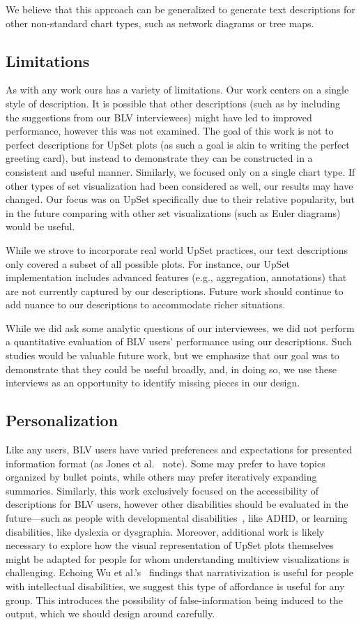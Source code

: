 \documentclass{egpubl}
\newcommand{\etal}{et al.}
\newcommand{\etals}{et al.'s}
\newcommand{\eg}{{e.g.,}}
\begin{document}
We believe that this approach can be generalized to generate text descriptions for other non-standard chart types, such as network diagrams or tree maps.

\subsection{Limitations}
As with any work ours has a variety of limitations.
Our work centers on a single style of description. It is possible that other descriptions (such as by including the suggestions from our BLV interviewees) might have led to improved performance, however this was not examined. The goal of this work is not to perfect descriptions for UpSet plots (as such a goal is akin to writing the perfect greeting card), but instead to demonstrate they can be constructed in a consistent and useful manner.
Similarly, we focused only on a single chart type. If other types of set visualization had been considered as well, our results may have changed. Our focus was on UpSet specifically due to their relative popularity, but in the future comparing with other set visualizations (such as Euler diagrams) would be useful.

While we strove to incorporate real world UpSet practices, our text descriptions only covered a subset of all possible plots. For instance, our UpSet implementation includes advanced features (\eg{} aggregation, annotations) that are not currently captured by our descriptions. Future work should continue to add nuance to our descriptions to accommodate richer situations.

While we did ask some analytic questions of our interviewees, we did not perform a quantitative evaluation of BLV users' performance using our descriptions. Such studies would be valuable future work, but we emphasize that our goal was to demonstrate that they could be useful broadly, and, in doing so, we use these interviews as an opportunity to identify missing pieces in our design.


\subsection{Personalization}
Like any users, BLV users have varied preferences and expectations for presented information format (as Jones \etal{}~\cite{jones_customization_2024} note).
Some may prefer to have topics organized by bullet points, while others may prefer iteratively expanding summaries.
Similarly, this work exclusively focused on the accessibility of descriptions for BLV users, however other disabilities should be evaluated in the future---such as people with developmental disabilities~\cite{wu_understanding_2021}, like ADHD, or learning disabilities, like dyslexia or dysgraphia.
Moreover, additional work is likely necessary to explore how the visual representation of UpSet plots themselves might be adapted for people for whom understanding multiview visualizations is challenging.
Echoing Wu \etals{}~\cite{wu_our_2024} findings that narrativization is useful for people with intellectual disabilities, we suggest this type of affordance is useful for any group. This introduces the possibility of false-information being induced to the output, which we should design around carefully.
\end{document}
